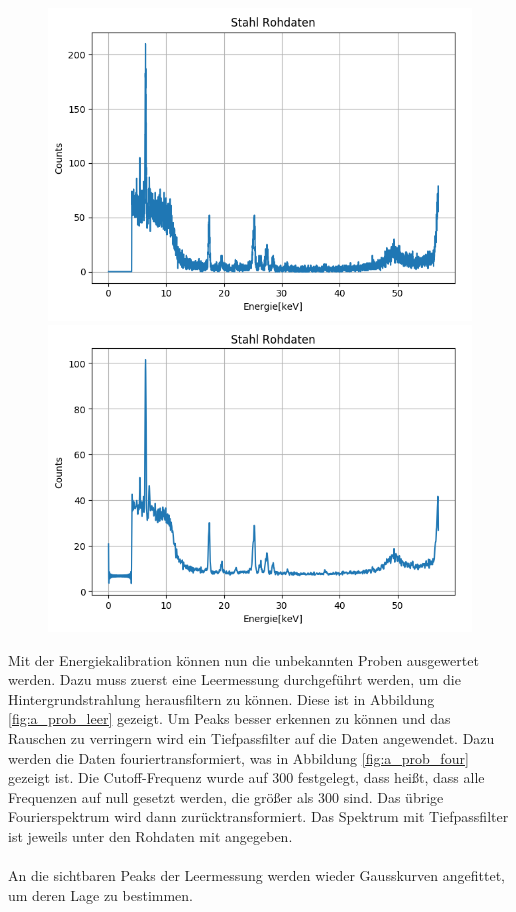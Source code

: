 \documentclass[12pt,a4paper]{article}
\begin{document}
\begin{figure}
\centering
\includegraphics[scale=0.8]{Bilder/alpha_spektren/stahl_roh.png}
\includegraphics[scale=0.8]{Bilder/alpha_spektren/stahl_cut.png}
\caption{}
\label{fig:kal_linreg}
\end{figure}

Mit der Energiekalibration können nun die unbekannten Proben ausgewertet werden. Dazu muss zuerst eine Leermessung durchgeführt werden, um die Hintergrundstrahlung herausfiltern zu können. Diese ist in Abbildung \ref{fig:a_prob_leer} gezeigt. Um Peaks besser erkennen zu können und das Rauschen zu verringern wird ein Tiefpassfilter auf die Daten angewendet. Dazu werden die Daten fouriertransformiert, was in Abbildung \ref{fig:a_prob_four} gezeigt ist. Die Cutoff-Frequenz wurde auf 300 festgelegt, dass heißt, dass alle Frequenzen auf null gesetzt werden, die größer als 300 sind. Das übrige Fourierspektrum wird dann zurücktransformiert. Das Spektrum mit Tiefpassfilter ist jeweils unter den Rohdaten mit angegeben.\\
\\
An die sichtbaren Peaks der Leermessung werden wieder Gausskurven angefittet, um deren Lage zu bestimmen. 
\end{document}
